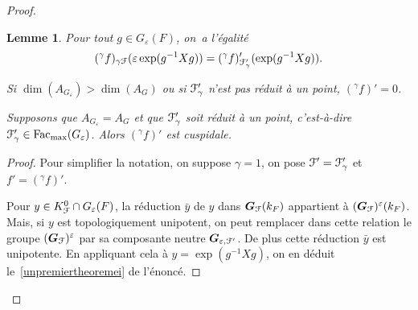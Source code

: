 \documentclass[11pt]{article}
\newcommand{\skpt}{\smallskip}
\numberwithin{equation}{section}\providecommand{\og}{«\,}\providecommand{\fg}{\,»}
\let\mathcal \EuScript
\let\oldenumerate\enumerate
\renewcommand{\enumerate}{\oldenumerate\itemindent0pt}
\newenvironment{enumeratei}
{\bgroup\def\theenumi{\roman{enumi}}\def\theenumii{\arabic{enumii}}\oldenumerate}
{\endenumerate\egroup}
\let\epsilon\varepsilon
\newcommand{\Fac}{\mathrm{Fac}}
\newcommand{\bG}{\boldsymbol{G}}
\newcommand{\cF}{\mathcal{F}}
\theoremstyle{plain}
\newtheorem*{lem*}{Lemme}
\theoremstyle{definition}
\begin{document}
\begin{proof}
\skpt
\begin{lem*}
\begin{enumeratei}
\item\label{unpremiertheoremei}
Pour tout $g\in G_{\epsilon}(F)$, on~a l'égalité
\[
(^{\gamma}f)_{\gamma\cF}(\epsilon \exp(g^{-1} Xg))=(^{\gamma}f)'_{\cF_{\gamma}'}(\exp(g^{-1}Xg)).
\]

\item\label{unpremiertheoremeii}
Si $\dim(A_{G_{\epsilon}})> \dim(A_{G})$ ou si $\cF'_{\gamma}$ n'est pas réduit à un point, $ (^{\gamma}f)'=0$.

\item\label{unpremiertheoremeiii}
Supposons que $A_{G_{\epsilon}}=A_{G}$ et que $\cF'_{\gamma}$ soit réduit à un point, c'est-à-dire $\cF_{\gamma}'\in \Fac_{\max}(G_{\epsilon})$. Alors $(^{\gamma}f)'$ est cuspidale.
\end{enumeratei}
\end{lem*}

\begin{proof}
Pour simplifier la notation, on suppose $\gamma=1$, on pose $\cF'=\cF'_{\gamma}$ et $f'=(^{\gamma}f)'$.

Pour $y\in K_{\cF}^0\cap G_{\epsilon}(F)$, la réduction $\bar{y}$ de $y$ dans $\bG_{\cF}(k_{F})$ appartient à $(\bG_{\cF})^{\epsilon}(k_{F})$. Mais, si $y$ est topologiquement unipotent, on peut remplacer dans cette relation le groupe $(\bG_{\cF})^{\epsilon}$ par sa composante neutre $\bG_{\epsilon,\cF'}$. De plus cette réduction $\bar{y}$ est unipotente. En appliquant cela à $y=\exp(g^{-1}Xg)$, on en déduit le~\eqref{unpremiertheoremei} de l'énoncé.


\end{proof}
\end{proof}
\end{document}
